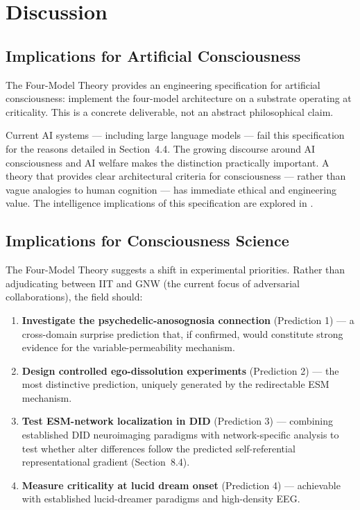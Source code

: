 \documentclass[12pt]{article}
\begin{document}
\section{Discussion}



\subsection{Implications for Artificial Consciousness}


The Four-Model Theory provides an engineering specification for artificial consciousness: implement the four-model architecture on a substrate operating at criticality. This is a concrete deliverable, not an abstract philosophical claim.

Current AI systems --- including large language models --- fail this specification for the reasons detailed in Section~4.4. The growing discourse around AI consciousness \citep{Butlin2023,Butlin2025,Schwitzgebel2025,Birch2025} and AI welfare \citep{Long2024,Anthropic2025} makes the distinction practically important. A theory that provides clear architectural criteria for consciousness --- rather than vague analogies to human cognition --- has immediate ethical and engineering value. The intelligence implications of this specification are explored in \citet{Gruber2026a}.


\subsection{Implications for Consciousness Science}


The Four-Model Theory suggests a shift in experimental priorities. Rather than adjudicating between IIT and GNW (the current focus of adversarial collaborations), the field should:

\begin{enumerate}
\item \textbf{Investigate the psychedelic-anosognosia connection} (Prediction 1) --- a cross-domain surprise prediction that, if confirmed, would constitute strong evidence for the variable-permeability mechanism.
\item \textbf{Design controlled ego-dissolution experiments} (Prediction 2) --- the most distinctive prediction, uniquely generated by the redirectable ESM mechanism.
\item \textbf{Test ESM-network localization in DID} (Prediction 3) --- combining established DID neuroimaging paradigms with network-specific analysis to test whether alter differences follow the predicted self-referential representational gradient (Section~8.4).
\item \textbf{Measure criticality at lucid dream onset} (Prediction 4) --- achievable with established lucid-dreamer paradigms and high-density EEG.
\end{enumerate}
\end{document}

